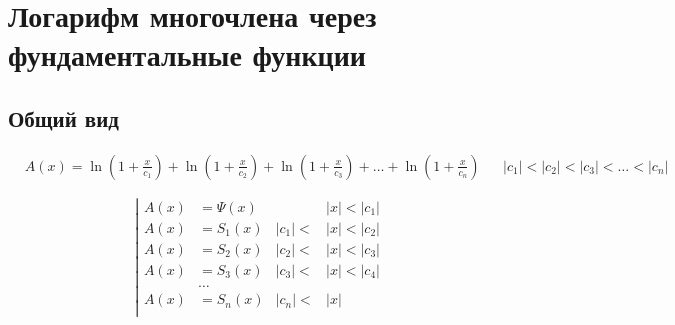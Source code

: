 
\section{Логарифм многочлена через фундаментальные функции}

\subsection{Общий вид}

\begin{equation*} \begin{aligned}
&A(x) =
  \ln{\left(1 + \frac{x}{c_1} \right)}
+ \ln{\left(1 + \frac{x}{c_2} \right)}
+ \ln{\left(1 + \frac{x}{c_3} \right)}
+ \ldots
+ \ln{\left(1 + \frac{x}{c_n} \right)} &
&|c_1| < |c_2| < |c_3| < \ldots < |c_n|
\end{aligned} \end{equation*}

\begin{equation*} \left| \begin{aligned}
A(x) &= \Psi(x) & 
&|x| < |c_1| \\
%
A(x) &= S_1(x) & 
|c_1| < &|x| < |c_2| \\
%
A(x) &= S_2(x) & 
|c_2| < &|x| < |c_3| \\
%
A(x) &= S_3(x) &
|c_3| < &|x| < |c_4| \\
&\ldots & & \\
%
A(x) &= S_n(x) &
|c_n| < &|x| \\
\end{aligned} \right. \end{equation*}

